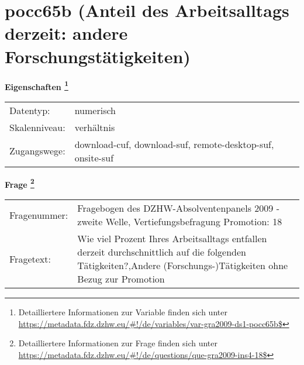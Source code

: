 
    \setcounter{footnote}{0}

    \vspace*{-1.8cm}
	\section{pocc65b (Anteil des Arbeitsalltags derzeit: andere Forschungstätigkeiten)}
	\label{section:pocc65b}



    \vspace*{0.5cm}
    \noindent\textbf{Eigenschaften
	\footnote{Detailliertere Informationen zur Variable finden sich unter
		\url{https://metadata.fdz.dzhw.eu/\#!/de/variables/var-gra2009-ds1-pocc65b$}}}\\
	\begin{tabularx}{\hsize}{@{}lX}
	Datentyp: & numerisch \\
	Skalenniveau: & verhältnis \\
	Zugangswege: &
	  download-cuf, 
	  download-suf, 
	  remote-desktop-suf, 
	  onsite-suf
 \\
    \end{tabularx}



				\vspace*{0.5cm}
                \noindent\textbf{Frage
	                \footnote{Detailliertere Informationen zur Frage finden sich unter
		              \url{https://metadata.fdz.dzhw.eu/\#!/de/questions/que-gra2009-ins4-18$}}}\\
				\begin{tabularx}{\hsize}{@{}lX}
					Fragenummer: &
					  Fragebogen des DZHW-Absolventenpanels 2009 - zweite Welle, Vertiefungsbefragung Promotion:
					  18
 \\
					Fragetext: & Wie viel Prozent Ihres Arbeitsalltags entfallen derzeit durchschnittlich auf die folgenden Tätigkeiten?,Andere (Forschungs-)Tätigkeiten ohne Bezug zur Promotion \\
				\end{tabularx}





